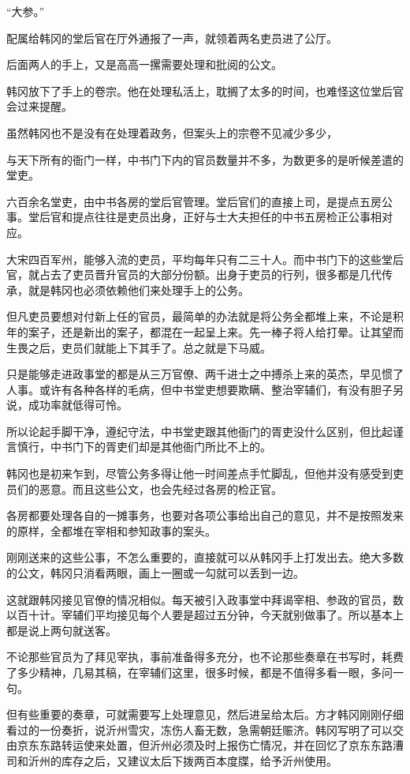 “大参。”

配属给韩冈的堂后官在厅外通报了一声，就领着两名吏员进了公厅。

后面两人的手上，又是高高一摞需要处理和批阅的公文。

韩冈放下了手上的卷宗。他在处理私活上，耽搁了太多的时间，也难怪这位堂后官会过来提醒。

虽然韩冈也不是没有在处理着政务，但案头上的宗卷不见减少多少，

与天下所有的衙门一样，中书门下内的官员数量并不多，为数更多的是听候差遣的堂吏。

六百余名堂吏，由中书各房的堂后官管理。堂后官们的直接上司，是提点五房公事。堂后官和提点往往是吏员出身，正好与士大夫担任的中书五房检正公事相对应。

大宋四百军州，能够入流的吏员，平均每年只有二三十人。而中书门下的这些堂后官，就占去了吏员晋升官员的大部分份额。出身于吏员的行列，很多都是几代传承，就是韩冈也必须依赖他们来处理手上的公务。

但凡吏员要想对付新上任的官员，最简单的办法就是将公务全都堆上来，不论是积年的案子，还是新出的案子，都混在一起呈上来。先一棒子将人给打晕。让其望而生畏之后，吏员们就能上下其手了。总之就是下马威。

只是能够走进政事堂的都是从三万官僚、两千进士之中搏杀上来的英杰，早见惯了人事。或许有各种各样的毛病，但中书堂吏想要欺瞒、整治宰辅们，有没有胆子另说，成功率就低得可怜。

所以论起手脚干净，遵纪守法，中书堂吏跟其他衙门的胥吏没什么区别，但比起谨言慎行，中书门下的胥吏们却是其他衙门所比不上的。

韩冈也是初来乍到，尽管公务多得让他一时间差点手忙脚乱，但他并没有感受到吏员们的恶意。而且这些公文，也会先经过各房的检正官。

各房都要处理各自的一摊事务，也要对各项公事给出自己的意见，并不是按照发来的原样，全都堆在宰相和参知政事的案头。

刚刚送来的这些公事，不怎么重要的，直接就可以从韩冈手上打发出去。绝大多数的公文，韩冈只消看两眼，画上一圈或一勾就可以丢到一边。

这就跟韩冈接见官僚的情况相似。每天被引入政事堂中拜谒宰相、参政的官员，数以百十计。宰辅们平均接见每个人要是超过五分钟，今天就别做事了。所以基本上都是说上两句就送客。

不论那些官员为了拜见宰执，事前准备得多充分，也不论那些奏章在书写时，耗费了多少精神，几易其稿，在宰辅们这里，很多时候，都是不值得多看一眼，多问一句。

但有些重要的奏章，可就需要写上处理意见，然后进呈给太后。方才韩冈刚刚仔细看过的一份奏折，说沂州雪灾，冻伤人畜无数，急需朝廷赈济。韩冈写明了可以交由京东东路转运使来处置，但沂州必须及时上报伤亡情况，并在回忆了京东东路漕司和沂州的库存之后，又建议太后下拨两百本度牒，给予沂州使用。

